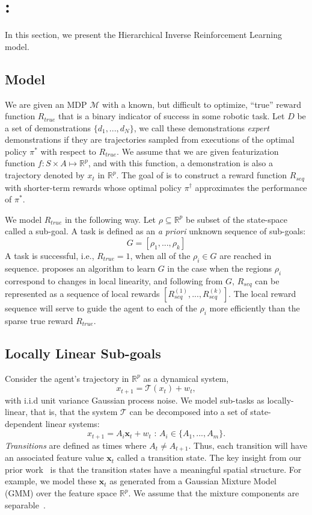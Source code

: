 \section{\hirl:\hirlfull}
In this section, we present the Hierarchical Inverse Reinforcement Learning model.

\subsection{\hirl Model}
We are given an MDP $\mathcal{M}$ with a known, but difficult to optimize, ``true'' reward function $R_{true}$ that is a binary indicator of success in some robotic task.
Let $D$ be a set of demonstrations $\{d_1,...,d_N\}$, we call these demonstrations \emph{expert} demonstrations if they are trajectories sampled from executions of the optimal policy $\pi^*$ with respect to $R_{true}$.
We assume that we are given featurization function $f:S\times A \mapsto \mathbb{R}^p$, and with this function, a demonstration is also a trajectory denoted by $x_t$ in $\mathbb{R}^p$.
The goal of \hirl is to construct a reward function $R_{seq}$ with shorter-term rewards whose optimal policy $\pi^\dagger$ approximates the performance of $\pi^*$.

We model $R_{true}$ in the following way.
Let $\rho \subseteq \mathbb{R}^p$ be subset of the state-space called a sub-goal.
A task is defined as an \emph{a priori} unknown sequence of sub-goals:
\[
G = [\rho_1,...,\rho_k]
\]
A task is successful, i.e., $R_{true}=1$, when all of the $\rho_i \in G$ are reached in sequence.
\hirl proposes an algorithm to learn $G$ in the case when the regions $\rho_i$ correspond to changes in local linearity, and following from $G$, $R_{seq}$ can be represented as a sequence of local rewards $[R^{(1)}_{seq},...,R^{(k)}_{seq}]$. 
The local reward sequence will serve to guide the agent to each of the $\rho_i$ more efficiently than the sparse true reward $R_{true}$.

\subsection{Locally Linear Sub-goals}
Consider the agent's trajectory in $\mathbb{R}^p$ as a dynamical system,
\[
x_{t+1} = \mathcal{T}(x_{t}) + w_{t},
\]
with i.i.d unit variance Gaussian process noise.
We model sub-tasks as locally-linear, that is, that the system $\mathcal{T}$ can be decomposed into a set of state-dependent linear systems:
\[
x_{t+1} = A_{i}\mathbf{x}_t + w_{t} \text{ : } A_i \in \{A_1,...,A_m\}.
\]
\emph{Transitions} are defined as times where $A_{t} \ne A_{t+1}$.
Thus, each transition will have an associated feature value $\mathbf{x}_{t}$ called a transition state.
The key insight from our prior work~\cite{krishnan2015tsc} is that the transition states have a meaningful spatial structure.
For example, we model these $\mathbf{x}_{t}$ as generated from a Gaussian Mixture Model (GMM) over the feature space $\mathbb{R}^p$.
We assume that the mixture components are separable~\cite{dasgupta2000two}.


